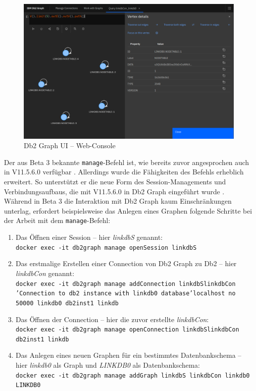 \begin{figure}[!ht]
    \centering
    \includegraphics[width=\textwidth]{images/db2_graph_webconsole.png}
    \vspace{0.1em}
    \caption[Db2 Graph UI -- Web-Console]{Db2 Graph UI -- Web-Console}
    \label{fig:db2_graph_webconsole}
\end{figure}

Der aus Beta 3 bekannte \texttt{manage}-Befehl ist, wie bereits zuvor angesprochen auch in V11.5.6.0 verfügbar \cite{ibm_docs_db2_graph_commands}. Allerdings wurde die Fähigkeiten des Befehls erheblich erweitert. So unterstützt er die neue Form des Session-Managements und Verbindungsaufbaus, die mit V11.5.6.0 in Db2 Graph eingeführt wurde \cite{ibm_docs_db2_graph_commands}. Während in Beta 3 die Interaktion mit Db2 Graph kaum Einschränkungen unterlag, erfordert beispielsweise das Anlegen eines Graphen folgende Schritte bei der Arbeit mit dem \texttt{manage}-Befehl:

\begin{enumerate}
    \item Das Öffnen einer Session -- hier \textit{linkdbS} genannt:\\
    \texttt{docker exec -it db2graph manage openSession linkdbS}
    \item Das erstmalige Erstellen einer Connection von Db2 Graph zu Db2 -- hier \textit{linkdbCon} genannt:\\
    \texttt{docker exec -it db2graph manage addConnection linkdbS\break linkdbCon 'Connection to db2 instance with linkdb0 database'\break localhost no 50000 linkdb0 db2inst1 linkdb}
    \item Das Öffnen der Connection -- hier die zuvor erstellte \textit{linkdbCon}:\\
    \texttt{docker exec -it db2graph manage openConnection linkdbS\break linkdbCon db2inst1 linkdb}
    \item Das Anlegen eines neuen Graphen für ein bestimmtes Datenbankschema -- hier \textit{linkdb0} als Graph und \textit{LINKDB0} als Datenbankschema:\\ 
    \texttt{docker exec -it db2graph manage addGraph linkdbS linkdbCon \break linkdb0 LINKDB0}
\end{enumerate}

